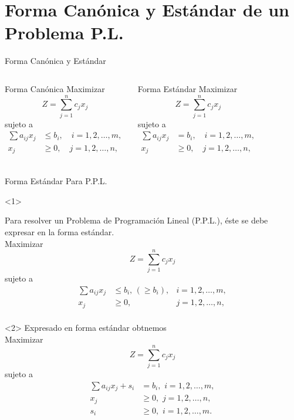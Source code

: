 
\section{Forma Canónica y Estándar de un Problema P.L.}
\label{sec:canonical-standard-form}

\begin{frame}{Forma Canónica y Estándar}
  \begin{columns}
      \begin{block}{Forma Canónica}
  Maximizar \[ Z = \sum_{j=1}^{n} c_j x_j\] 
  sujeto a
  \begin{align*}
    \sum a_{ij}x_j  & \leq b_i, \quad i = 1, 2, \ldots, m,\\
    x_j  & \geq 0, \quad j = 1, 2, \ldots, n,\\
  \end{align*}  
\end{block}
\begin{block}{Forma Estándar}
    Maximizar \[ Z = \sum_{j=1}^{n} c_j x_j\] 
  sujeto a
  \begin{align*}
    \sum a_{ij}x_j  & = b_i, \quad i = 1, 2, \ldots, m,\\
    x_j  & \geq 0, \quad j = 1, 2, \ldots, n,\\
  \end{align*}
\end{block}
  \end{columns}
\end{frame}


\begin{frame}{Forma Estándar Para P.P.L.}
  \begin{onlyenv}<1>
    
    Para resolver un Problema de Programación Lineal (P.P.L.), éste se debe expresar en la forma estándar.\\

    Maximizar \[ Z = \sum_{j=1}^{n} c_j x_j\] 
  sujeto a
  \begin{align*}
    \sum a_{ij}x_j  & \leq  b_i, \, (\geq b_i), & i = 1, 2, \ldots, m,\\
    x_j  & \geq 0, & j = 1, 2, \ldots, n,\\
  \end{align*}
\end{onlyenv}
\begin{onlyenv}<2>
  Expresado en forma estándar obtnemos\\

  Maximizar \[ Z = \sum_{j=1}^{n} c_j x_j\] 
  sujeto a
  \begin{align*}
    \sum a_{ij}x_j + s_i & =  b_i,  \,\, i = 1, 2, \ldots, m,\\
    x_j  & \geq 0, \, \, j = 1, 2, \ldots, n,\\
    s_i  & \geq 0, \, \, i = 1, 2, \ldots, m.\\
  \end{align*}
\end{onlyenv}
\end{frame}


